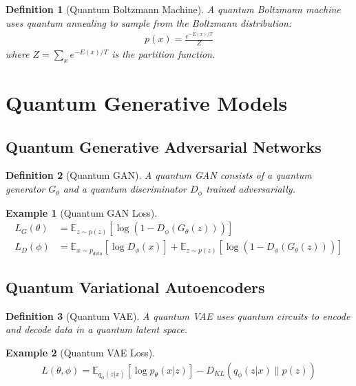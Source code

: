 \documentclass[11pt]{article}
\newtheorem{definition}{Definition}[section]
\newtheorem{example}{Example}[section]
\begin{document}
\begin{definition}[Quantum Boltzmann Machine]
A quantum Boltzmann machine uses quantum annealing to sample from the Boltzmann distribution:
\begin{align}
p(x) = \frac{e^{-E(x)/T}}{Z}
\end{align}
where $Z = \sum_x e^{-E(x)/T}$ is the partition function.
\end{definition}

\section{Quantum Generative Models}

\subsection{Quantum Generative Adversarial Networks}

\begin{definition}[Quantum GAN]
A quantum GAN consists of a quantum generator $G_\theta$ and a quantum discriminator $D_\phi$ trained adversarially.
\end{definition}

\begin{example}[Quantum GAN Loss]
\begin{align}
L_G(\theta) &= \mathbb{E}_{z \sim p(z)}[\log(1 - D_\phi(G_\theta(z)))] \\
L_D(\phi) &= \mathbb{E}_{x \sim p_{data}}[\log D_\phi(x)] + \mathbb{E}_{z \sim p(z)}[\log(1 - D_\phi(G_\theta(z)))]
\end{align}
\end{example}

\subsection{Quantum Variational Autoencoders}

\begin{definition}[Quantum VAE]
A quantum VAE uses quantum circuits to encode and decode data in a quantum latent space.
\end{definition}

\begin{example}[Quantum VAE Loss]
\begin{align}
L(\theta, \phi) = \mathbb{E}_{q_\phi(z|x)}[\log p_\theta(x|z)] - D_{KL}(q_\phi(z|x) \| p(z))
\end{align}
\end{example}
\end{document}
